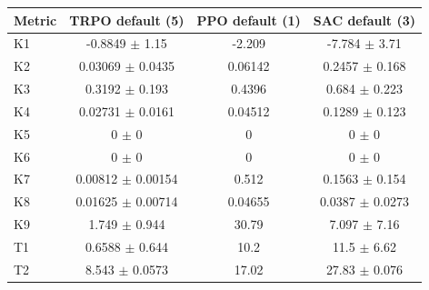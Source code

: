 \begin{tabular}{lccc}
\toprule
Metric & TRPO default (5) & PPO default (1) & SAC default (3) \\
\midrule
K1 & -0.8849 $\pm$ 1.15 & -2.209 & -7.784 $\pm$ 3.71 \\
K2 & 0.03069 $\pm$ 0.0435 & 0.06142 & 0.2457 $\pm$ 0.168 \\
K3 & 0.3192 $\pm$ 0.193 & 0.4396 & 0.684 $\pm$ 0.223 \\
K4 & 0.02731 $\pm$ 0.0161 & 0.04512 & 0.1289 $\pm$ 0.123 \\
K5 & 0 $\pm$ 0 & 0 & 0 $\pm$ 0 \\
K6 & 0 $\pm$ 0 & 0 & 0 $\pm$ 0 \\
K7 & 0.00812 $\pm$ 0.00154 & 0.512 & 0.1563 $\pm$ 0.154 \\
K8 & 0.01625 $\pm$ 0.00714 & 0.04655 & 0.0387 $\pm$ 0.0273 \\
K9 & 1.749 $\pm$ 0.944 & 30.79 & 7.097 $\pm$ 7.16 \\
T1 & 0.6588 $\pm$ 0.644 & 10.2 & 11.5 $\pm$ 6.62 \\
T2 & 8.543 $\pm$ 0.0573 & 17.02 & 27.83 $\pm$ 0.076 \\
\bottomrule
\end{tabular}
